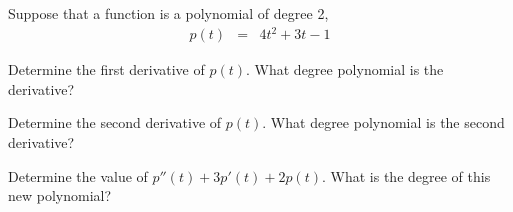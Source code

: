 



\begin{problem}
\item Suppose that a function is a polynomial of degree 2,
  \begin{eqnarray}
    p(t) & = & 4t^2 + 3t - 1
  \end{eqnarray}

  \begin{subproblem}
  \item Determine the first derivative of $p(t)$. What degree polynomial is
    the derivative?

    \vspace{4cm}

  \item Determine the second derivative of $p(t)$. What degree
    polynomial is the second derivative?  

    \vspace{4cm}

  \item Determine the value of $p''(t)+3p'(t)+2p(t)$. What is the
    degree of this new polynomial? 


    \vfill

  \end{subproblem}

\end{problem}


